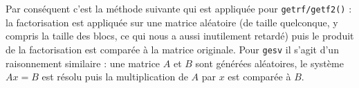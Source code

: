 Par conséquent c'est la méthode suivante qui est appliquée pour \texttt{getrf/getf2()} : la factorisation est appliquée sur une matrice aléatoire (de taille quelconque, y compris la taille des blocs, ce qui nous a aussi inutilement retardé) puis le produit de la factorisation est comparée à la matrice originale. Pour \texttt{gesv} il s'agit d'un raisonnement similaire : une matrice $A$ et $B$ sont générées aléatoires, le système $Ax = B$ est résolu puis la multiplication de $A$ par $x$ est comparée à $B$.

